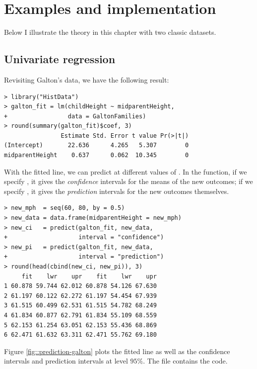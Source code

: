 \section{Examples and  implementation}
\label{sec::normallinearmodel-r}


Below I illustrate the theory in this chapter with two classic datasets. 


\subsection{Univariate regression}


Revisiting Galton's data, we have the following result: 

\begin{lstlisting}
> library("HistData")
> galton_fit = lm(childHeight ~ midparentHeight,
+                 data = GaltonFamilies)
> round(summary(galton_fit)$coef, 3)
                Estimate Std. Error t value Pr(>|t|)
(Intercept)       22.636      4.265   5.307        0
midparentHeight    0.637      0.062  10.345        0
\end{lstlisting}


With the fitted line, we can predict  at different values of . In the  function, if we specify , it gives the {\it confidence} intervals for the means of the new outcomes; if we specify , it gives the {\it prediction} intervals for the new outcomes themselves. 

\begin{lstlisting}
> new_mph  = seq(60, 80, by = 0.5)
> new_data = data.frame(midparentHeight = new_mph)
> new_ci   = predict(galton_fit, new_data, 
+                    interval = "confidence")
> new_pi   = predict(galton_fit, new_data, 
+                    interval = "prediction")
> round(head(cbind(new_ci, new_pi)), 3)
     fit    lwr    upr    fit    lwr    upr
1 60.878 59.744 62.012 60.878 54.126 67.630
2 61.197 60.122 62.272 61.197 54.454 67.939
3 61.515 60.499 62.531 61.515 54.782 68.249
4 61.834 60.877 62.791 61.834 55.109 68.559
5 62.153 61.254 63.051 62.153 55.436 68.869
6 62.471 61.632 63.311 62.471 55.762 69.180
\end{lstlisting}



Figure \ref{fig::prediction-galton} plots the fitted line as well as the confidence intervals and prediction intervals at level $95\%$.  The file  contains the   code. 

